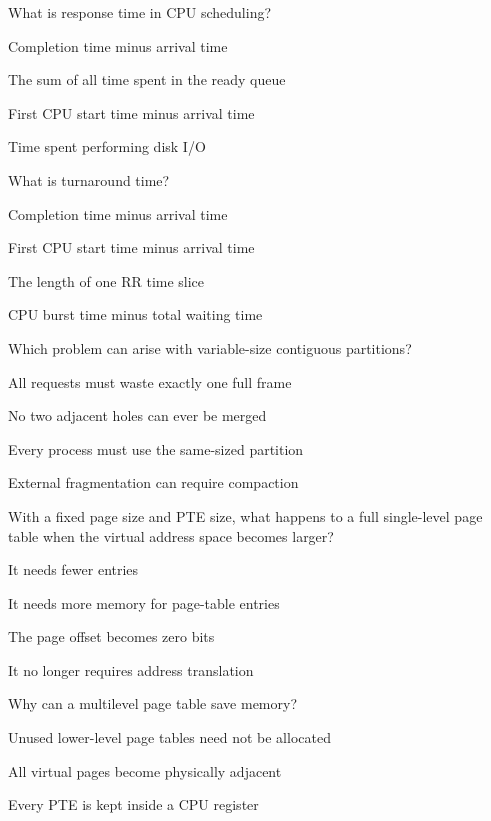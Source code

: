 \begin{questions}\setlength{\itemsep}{0.12cm}\setcounter{question}{30}
\question What is response time in CPU scheduling?
\begin{verticalchoices}
\item Completion time minus arrival time
\item The sum of all time spent in the ready queue
\item First CPU start time minus arrival time
\item Time spent performing disk I/O
\end{verticalchoices}
\question What is turnaround time?
\begin{verticalchoices}
\item Completion time minus arrival time
\item First CPU start time minus arrival time
\item The length of one RR time slice
\item CPU burst time minus total waiting time
\end{verticalchoices}
\question Which problem can arise with variable-size contiguous partitions?
\begin{verticalchoices}
\item All requests must waste exactly one full frame
\item No two adjacent holes can ever be merged
\item Every process must use the same-sized partition
\item External fragmentation can require compaction
\end{verticalchoices}
\question With a fixed page size and PTE size, what happens to a full single-level page table when the virtual address space becomes larger?
\begin{verticalchoices}
\item It needs fewer entries
\item It needs more memory for page-table entries
\item The page offset becomes zero bits
\item It no longer requires address translation
\end{verticalchoices}
\question Why can a multilevel page table save memory?
\begin{verticalchoices}
\item Unused lower-level page tables need not be allocated
\item All virtual pages become physically adjacent
\item Every PTE is kept inside a CPU register

\end{verticalchoices}
\end{questions}
